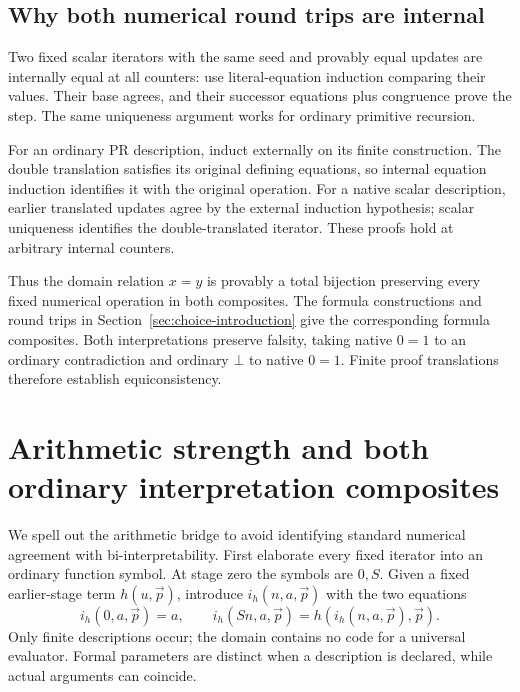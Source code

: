 \documentclass[11pt,a4paper]{article}
\theoremstyle{definition}\newtheorem{definition}[theorem]{Definition}
\begin{document}
\subsection{Why both numerical round trips are internal}

Two fixed scalar iterators with the same seed and provably equal
updates are internally equal at all counters: use literal-equation
induction comparing their values. Their base agrees, and their
successor equations plus congruence prove the step. The same
uniqueness argument works for ordinary primitive recursion.

For an ordinary PR description, induct externally on its finite
construction. The double translation satisfies its original
defining equations, so internal equation induction identifies it
with the original operation. For a native scalar description,
earlier translated updates agree by the external induction
hypothesis; scalar uniqueness identifies the double-translated
iterator. These proofs hold at arbitrary internal counters.

Thus the domain relation $x=y$ is provably a total bijection
preserving every fixed numerical operation in both composites.
The formula constructions and round trips in
Section~\ref{sec:choice-introduction} give the corresponding formula
composites. Both interpretations preserve falsity, taking native
$0=1$ to an ordinary contradiction and ordinary $\bot$ to native
$0=1$. Finite proof translations therefore establish equiconsistency.



\section{Arithmetic strength and both ordinary interpretation composites}
\label{sec:ordinary-bridge}

We spell out the arithmetic bridge to avoid identifying standard numerical
agreement with bi-interpretability. First elaborate every fixed iterator
into an ordinary function symbol. At stage zero the symbols are $0,S$.
Given a fixed earlier-stage term $h(u,\vec p)$, introduce
$i_h(n,a,\vec p)$ with the two equations
\[
i_h(0,a,\vec p)=a,\qquad
i_h(Sn,a,\vec p)=h(i_h(n,a,\vec p),\vec p).
\]
Only finite descriptions occur; the domain contains no code for a
universal evaluator. Formal parameters are distinct when a description
is declared, while actual arguments can coincide.
\end{document}

